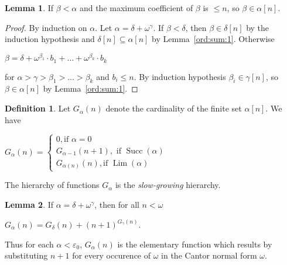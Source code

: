 \documentclass[8pt]{article}
\theoremstyle{definition}
\newtheorem{definition}{Definition}[section]
\theoremstyle{definition}
\theoremstyle{definition}
\theoremstyle{definition}
\theoremstyle{definition}
\theoremstyle{definition}
\theoremstyle{definition}
\theoremstyle{definition}
\newtheorem{lemma}{Lemma}[section]
\theoremstyle{definition}
\theoremstyle{definition}
\theoremstyle{definition}
\theoremstyle{definition}
\theoremstyle{definition}
\theoremstyle{question}
\begin{document}
\begin{lemma}
  If $\beta < \alpha$ and the maximum coefficient of $\beta$ is $\leq n$, so $\beta \in \alpha[n]$. 
\end{lemma}

\begin{proof}
  By induction on $\alpha$. Let $\alpha = \delta + \omega^{\gamma}$. If $\beta < \delta$,
  then $\beta \in \delta[n]$ by the induction hypothesis and $\delta[n] \subseteq \alpha[n]$ by Lemma~\ref{ord:sum:1}.
  Otherwise
  \begin{center}
    $\beta = \delta + \omega^{\beta_1} \cdot b_1 + \dots + \omega^{\beta_k} \cdot b_k$
  \end{center}
  for $\alpha > \gamma > \beta_1 > \dots > \beta_k$ and $b_i \leq n$. By induction hypothesis 
  $\beta_i \in \gamma[n]$, so $\beta \in \alpha[n]$ by Lemma~\ref{ord:sum:1}.
\end{proof}

\begin{definition}
  Let $G_{\alpha}(n)$ denote the cardinality of the finite set $\alpha[n]$.
  We have

  \begin{center}
  $G_{\alpha}(n) = \begin{cases}
    0, \text{if $\alpha = 0$} \\
    G_{\alpha - 1}(n + 1), \text{ if $\operatorname{Succ}(\alpha)$} \\
    G_{\alpha(n)}(n), \text{if $\operatorname{Lim}(\alpha)$} 
  \end{cases}$
  \end{center}
\end{definition}

The hierarchy of functions $G_{\alpha}$ is the \emph{slow-growing} hierarchy.

\begin{lemma} If $\alpha = \delta + \omega^{\gamma}$, then for all $n < \omega$
  \begin{center}
    $G_{\alpha}(n) = G_{\delta}(n) + (n + 1)^{G_{\gamma}(n)}$.
  \end{center}
  Thus for each $\alpha < \varepsilon_0$, $G_{\alpha}(n)$ is the elementary function
  which results by substituting $n + 1$ for every occurence of $\omega$ in the Cantor normal form $\omega$.
\end{lemma}
\end{document}
